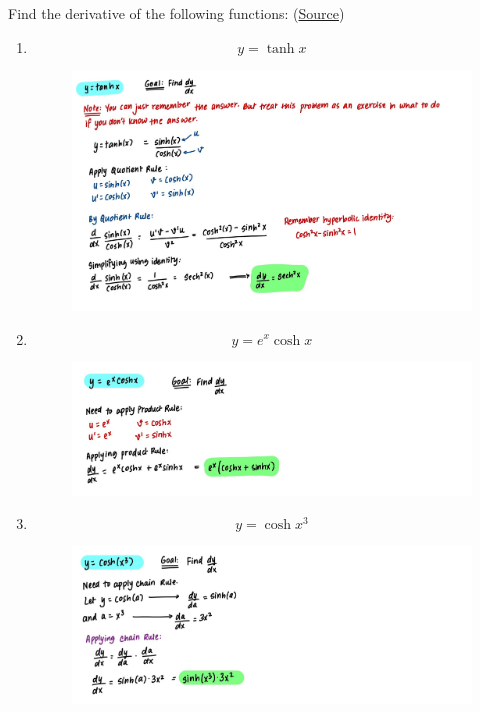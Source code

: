 \documentclass{article}
\begin{document}
\noindent Find the derivative of the following functions: 
\newline(\href{https://www.deanza.edu/faculty/kleincharles/documents/HyperbolicFunctionsProblems.pdf}{Source})
\begin{enumerate}
    \item $$y = \tanh x$$
    \begin{figure}[H]
        \centering
        \includegraphics[width=\linewidth]{Q1.jpg}
        \label{fig:Q1}
    \end{figure}
    \item $$y = e^x \cosh x$$
    \begin{figure}[H]
        \centering
        \includegraphics[width=\linewidth]{Q2.jpg}
        \label{fig:Q2}
    \end{figure}
    \item $$y = \cosh{x^3}$$
    \begin{figure}[H]
        \centering
        \includegraphics[width=\linewidth]{Q3.jpg}

\end{figure}
\end{enumerate}
\end{document}
